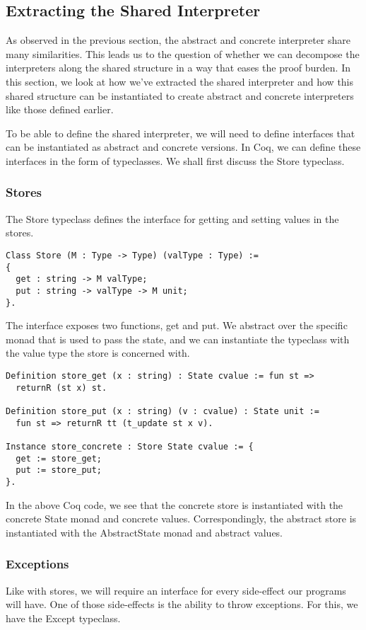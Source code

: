\subsection{Extracting the Shared Interpreter}\label{sec:shared_interpreter}
As observed in the previous section, the abstract and concrete interpreter
share many similarities. This leads us to the question of whether we can
decompose the interpreters along the shared structure in a way that eases the
proof burden. In this section, we look at how we've extracted the shared
interpreter and how this shared structure can be instantiated to create
abstract and concrete interpreters like those defined earlier.

To be able to define the shared interpreter, we will need to define interfaces
that can be instantiated as abstract and concrete versions. In Coq, we can
define these interfaces in the form of typeclasses. We shall first discuss the
Store typeclass.

\subsubsection{Stores}
The Store typeclass defines the interface for getting and setting values in the
stores. 
\begin{verbatim}
Class Store (M : Type -> Type) (valType : Type) :=
{
  get : string -> M valType;
  put : string -> valType -> M unit;
}.
\end{verbatim}

The interface exposes two functions, get and put. We abstract over the specific
monad that is used to pass the state, and we can instantiate the typeclass with
the value type the store is concerned with.

\begin{verbatim}
Definition store_get (x : string) : State cvalue := fun st =>
  returnR (st x) st.

Definition store_put (x : string) (v : cvalue) : State unit := 
  fun st => returnR tt (t_update st x v).

Instance store_concrete : Store State cvalue := {
  get := store_get;
  put := store_put;
}.
\end{verbatim}

In the above Coq code, we see that the concrete store is instantiated with the
concrete State monad and concrete values. Correspondingly, the abstract store
is instantiated with the AbstractState monad and abstract values.

\subsubsection{Exceptions}
Like with stores, we will require an interface for every side-effect our
programs will have. One of those side-effects is the ability to throw
exceptions. For this, we have the Except typeclass.

